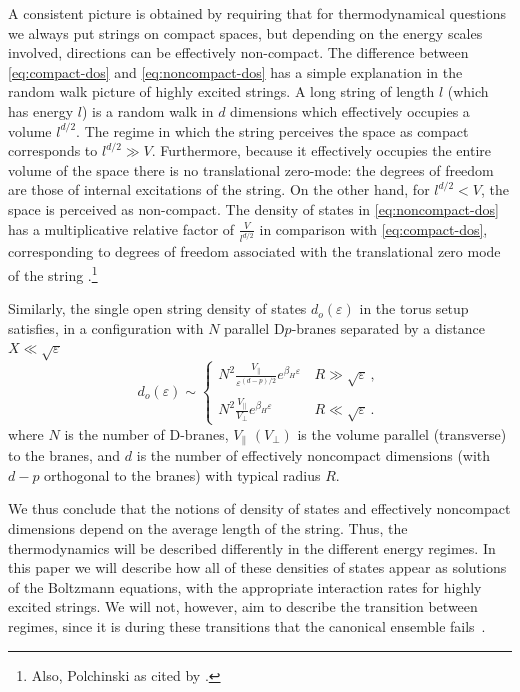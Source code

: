 \documentclass[a4paper,11pt]{article}
\begin{document}
A consistent picture is obtained by requiring that for thermodynamical questions we always put strings
on compact spaces, but depending on the energy scales involved, directions can be effectively non-compact. The difference between \eqref{eq:compact-dos} and \eqref{eq:noncompact-dos} has a simple
explanation in the random walk picture of highly excited strings. A long string of length $l$ 
(which has energy $l$) is a random walk in $d$ dimensions which effectively occupies a volume
$l^{d/2}$. The regime in which the string perceives the space as compact corresponds to
  $l^{d/2} \gg V$. 
Furthermore, because it effectively occupies the entire volume of the space there is no translational zero-mode: the degrees of freedom
are those of internal excitations of the string.  On the other hand, for  $l^{d/2} < V$,
the space is perceived as non-compact. The density of states in \eqref{eq:noncompact-dos}
has a multiplicative relative factor of  $\frac{V}{ l^{d/2}}$ in comparison with \eqref{eq:compact-dos},
corresponding  to degrees of freedom associated with the translational zero mode
of the string \cite{Abel:1999rq}.\footnote{Also, Polchinski as cited by \cite{Lowe:1994nm}.} 

Similarly, the single open string density of states $d_o(\varepsilon)$ in the torus setup satisfies, in a configuration with $N$ parallel D$p$-branes separated by a distance $X\ll \sqrt{\varepsilon}$~\cite{Abel:1999rq}
\begin{equation}
    d_o(\varepsilon)\sim \begin{cases}
        N^2\frac{V_{\|}}{\varepsilon^{(d-p)/2}}e^{\beta_H \varepsilon}\, & R\gg \sqrt{\varepsilon}\, ,\\    
        & \\
        N^2\frac{V_{\|}}{V_{\perp}}e^{\beta_H \varepsilon}\, & R\ll \sqrt{\varepsilon}\, .
    \end{cases}
\end{equation}
where $N$ is the number of D-branes, $V_\|$ $(V_\perp)$ is the volume parallel (transverse) to the branes, and $d$ is the number of effectively noncompact dimensions (with $d-p$ orthogonal to the branes) with typical radius $R$. 

We thus conclude that the notions of density of states and effectively noncompact dimensions depend on the average length of the string. 
Thus, the thermodynamics will be described differently in the different energy regimes. In this paper we will describe how all of these densities of states appear as solutions of the Boltzmann equations, with the appropriate interaction rates for highly excited strings.
We will not, however, aim to describe the transition between regimes, since it is during these transitions that the canonical ensemble fails~\cite{Barbon:2004dd}.
\end{document}
